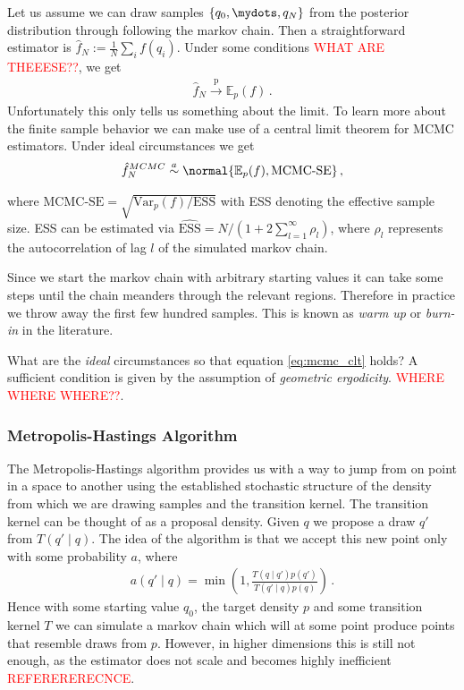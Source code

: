 Let us assume we can draw samples $\{q_0, \mydots, q_N\}$ from the posterior distribution through following
the markov chain. Then a straightforward estimator is $\hat{f}_N := \frac{1}{N} \sum_i f(q_i)$.
Under some conditions \textcolor{red}{WHAT ARE THEEESE??}, we get
\begin{align}
  \hat{f}_N \overset{\mathrm{p}}{\longrightarrow} \mathbb{E}_p(f) \,.
\end{align}
Unfortunately this only tells us something about the limit. To learn more about the
finite sample behavior we can make use of a central limit theorem for MCMC estimators.
Under ideal circumstances we get
\begin{align}
  \hat{f}_N^{MCMC} \overset{a}{\sim} \normal{\mathbb{E}_p(f), \text{MCMC-SE}} \,,
  \label{eq:mcmc_clt}
\end{align}

where $\text{MCMC-SE} = \sqrt{\text{Var}_p(f) / \text{ESS}}$ with ESS denoting the effective sample size.
ESS can be estimated via $\hat{\text{ESS}} = N / (1 + 2 \sum_{l=1}^\infty \rho_l)$, where $\rho_l$ represents
the autocorrelation of lag $l$ of the simulated markov chain.

Since we start the markov chain with arbitrary starting values it can take some
steps until the chain meanders through the relevant regions. Therefore in practice
we throw away the first few hundred samples. This is known as \emph{warm up} or
\emph{burn-in} in the literature.

What are the \emph{ideal} circumstances so that equation \ref{eq:mcmc_clt} holds?
A sufficient condition is given by the assumption of \emph{geometric ergodicity}.
\textcolor{red}{WHERE WHERE WHERE??}.

\subsubsection*{Metropolis-Hastings Algorithm}
The Metropolis-Hastings algorithm provides us with a way to jump from on point
in a space to another using the established stochastic structure of the density
from which we are drawing samples and the transition kernel. The transition kernel
can be thought of as a proposal density. Given $q$ we propose a draw $q'$ from $T(q' \mid q)$.
The idea of the algorithm is that we accept this new point only with some probability $a$,
where
\begin{align}
  a(q' \mid q) = \min \left (1, \frac{T(q\mid q') p(q')}{T(q' \mid q) p(q)} \right) \,.
\end{align}
Hence with some starting value $q_0$, the target density $p$ and some transition kernel $T$
we can simulate a markov chain which will at some point produce points that resemble draws
from $p$. However, in higher dimensions this is still not enough, as the estimator does
not scale and becomes highly inefficient \textcolor{red}{REFERERERECNCE}.







